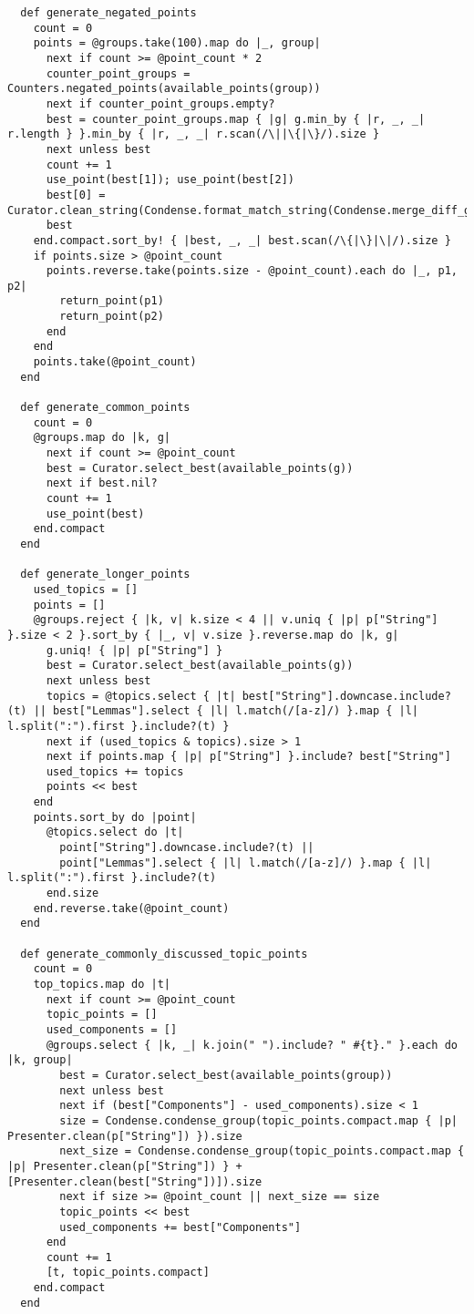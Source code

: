 \documentclass{article}
\begin{document}
\begin{verbatim}
  def generate_negated_points
    count = 0
    points = @groups.take(100).map do |_, group|
      next if count >= @point_count * 2
      counter_point_groups = Counters.negated_points(available_points(group))
      next if counter_point_groups.empty?
      best = counter_point_groups.map { |g| g.min_by { |r, _, _| r.length } }.min_by { |r, _, _| r.scan(/\||\{|\}/).size }
      next unless best
      count += 1
      use_point(best[1]); use_point(best[2])
      best[0] = Curator.clean_string(Condense.format_match_string(Condense.merge_diff_groups(best.first)))
      best
    end.compact.sort_by! { |best, _, _| best.scan(/\{|\}|\|/).size }
    if points.size > @point_count
      points.reverse.take(points.size - @point_count).each do |_, p1, p2|
        return_point(p1)
        return_point(p2)
      end
    end
    points.take(@point_count)
  end

  def generate_common_points
    count = 0
    @groups.map do |k, g|
      next if count >= @point_count
      best = Curator.select_best(available_points(g))
      next if best.nil?
      count += 1
      use_point(best)
    end.compact
  end

  def generate_longer_points
    used_topics = []
    points = []
    @groups.reject { |k, v| k.size < 4 || v.uniq { |p| p["String"] }.size < 2 }.sort_by { |_, v| v.size }.reverse.map do |k, g|
      g.uniq! { |p| p["String"] }
      best = Curator.select_best(available_points(g))
      next unless best
      topics = @topics.select { |t| best["String"].downcase.include?(t) || best["Lemmas"].select { |l| l.match(/[a-z]/) }.map { |l| l.split(":").first }.include?(t) }
      next if (used_topics & topics).size > 1
      next if points.map { |p| p["String"] }.include? best["String"]
      used_topics += topics
      points << best
    end
    points.sort_by do |point|
      @topics.select do |t|
        point["String"].downcase.include?(t) ||
        point["Lemmas"].select { |l| l.match(/[a-z]/) }.map { |l| l.split(":").first }.include?(t)
      end.size
    end.reverse.take(@point_count)
  end

  def generate_commonly_discussed_topic_points
    count = 0
    top_topics.map do |t|
      next if count >= @point_count
      topic_points = []
      used_components = []
      @groups.select { |k, _| k.join(" ").include? " #{t}." }.each do |k, group|
        best = Curator.select_best(available_points(group))
        next unless best
        next if (best["Components"] - used_components).size < 1
        size = Condense.condense_group(topic_points.compact.map { |p| Presenter.clean(p["String"]) }).size
        next_size = Condense.condense_group(topic_points.compact.map { |p| Presenter.clean(p["String"]) } + [Presenter.clean(best["String"])]).size
        next if size >= @point_count || next_size == size
        topic_points << best
        used_components += best["Components"]
      end
      count += 1
      [t, topic_points.compact]
    end.compact
  end


\end{verbatim}
\end{document}
